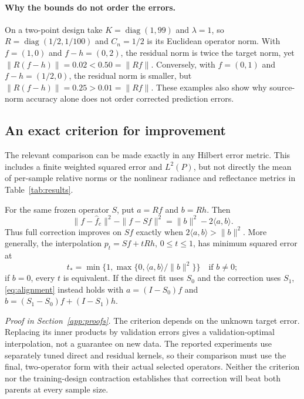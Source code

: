 \paragraph{Why the bounds do not order the errors.}
On a two-point design take $K=\operatorname{diag}(1,99)$ and $\lambda=1$, so
$R=\operatorname{diag}(1/2,1/100)$ and $C_n=1/2$ is its Euclidean operator norm. With
$f=(1,0)$ and $f-h=(0,2)$, the residual norm is twice the target norm, yet
$\|R(f-h)\|=0.02<0.50=\|Rf\|$. Conversely, with $f=(0,1)$ and $f-h=(1/2,0)$, the
residual norm is smaller, but $\|R(f-h)\|=0.25>0.01=\|Rf\|$. These examples also show why
source-norm accuracy alone does not order corrected prediction errors.

\subsection{An exact criterion for improvement}
The relevant comparison can be made exactly in any Hilbert error metric. This includes a
finite weighted squared error and $L^2(P)$, but not directly the mean of per-sample relative
norms or the nonlinear radiance and reflectance metrics in Table~\ref{tab:results}.

\begin{proposition}\label{prop:alignment}
For the same frozen operator $S$, put $a=Rf$ and $b=Rh$. Then
\begin{equation}\label{eq:alignment}
 \|f-\widehat f_c\|^2-\|f-Sf\|^2=\|b\|^2-2\langle a,b\rangle.
\end{equation}
Thus full correction improves on $Sf$ exactly when
$2\langle a,b\rangle>\|b\|^2$. More generally, the interpolation
$p_t=Sf+tRh$, $0\le t\le1$, has minimum squared error at
\begin{equation}\label{eq:shrink-mean}
 t_* = \min\{1,\max\{0,\langle a,b\rangle/\|b\|^2\}\}
 \quad\text{if }b\ne0;
\end{equation}
if $b=0$, every $t$ is equivalent. If the direct fit uses $S_0$ and the correction uses
$S_1$, \eqref{eq:alignment} instead holds with
$a=(I-S_0)f$ and $b=(S_1-S_0)f+(I-S_1)h$.
\end{proposition}
\noindent\emph{Proof in Section~\ref{app:proofs}.}
The criterion depends on the unknown target error. Replacing its inner
products by validation errors gives a validation-optimal interpolation, not a guarantee on new
data. The reported experiments use separately tuned direct and residual kernels, so their
comparison must use the final, two-operator form with their actual selected operators.
Neither the criterion nor the training-design contraction establishes that correction will
beat both parents at every sample size.

